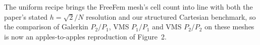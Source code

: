 \documentclass[11pt]{article}
\begin{document}
The uniform recipe brings the FreeFem mesh's cell count into line with both the paper's stated
$h=\sqrt2/N$ resolution and our structured Cartesian benchmark, so the comparison of Galerkin
$P_2/P_1$, VMS $P_1/P_1$ and VMS $P_2/P_2$ on these meshes is now an apples-to-apples reproduction of
Figure~2.
\end{document}
